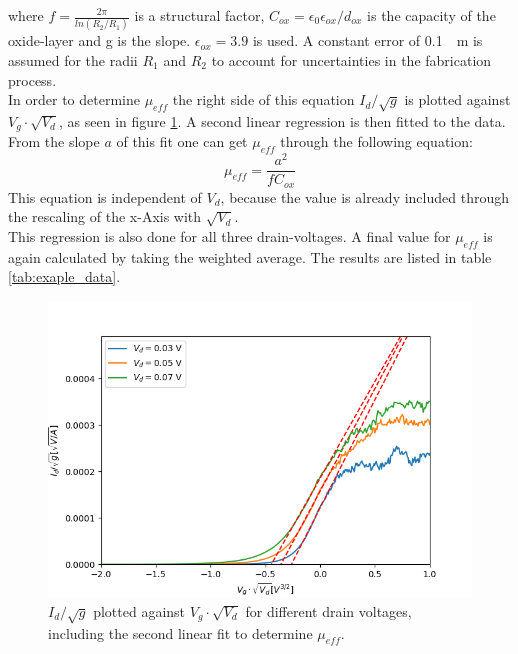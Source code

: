 \documentclass[%
 reprint,
amsmath,amssymb,
pra,
]{revtex4-1}
\begin{document}
where $f = \frac{2\pi}{ln(R_2/R_1)}$ is a structural factor, $C_{ox} = \epsilon_0 \epsilon_{ox} / d_{ox}$ is the capacity of the oxide-layer and g is the slope. $\epsilon_{ox} = 3.9$ is used. A constant error of \SI{0.1}{\mu m} is assumed for the radii $R_1$ and $R_2$ to account for uncertainties in the fabrication process.\\
In order to determine  $\mu_{eff}$ the right side of this equation $I_d/\sqrt{g}$ is plotted against $V_g \cdot \sqrt{V_d}$, as seen in figure \ref{fig:linreg2}. A second linear regression is then fitted to the data. From the slope $a$ of this fit one can get $\mu_{eff}$ through the following equation:
\begin{equation}
\mu_{eff} = \dfrac{a^2}{f C_{ox}}
\end{equation}
This equation is independent of $V_d$, because the value is already included through the rescaling of the x-Axis with $\sqrt{V_d}$.\\
This regression is also done for all three drain-voltages. A final value for $\mu_{eff}$ is again calculated by taking the weighted average. The results are listed in table \ref{tab:exaple_data}.
\begin{figure}
\centering
\includegraphics[scale=0.55]{Bilder/mu.png}
\caption{$I_d/\sqrt{g}$ plotted against $V_g \cdot \sqrt{V_d}$ for different drain voltages, including the second linear fit to determine $\mu_{eff}$.}
\label{fig:linreg2}
\end{figure}
\end{document}
